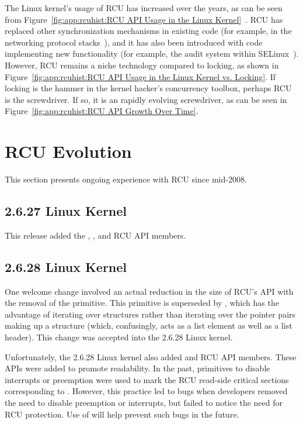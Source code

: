 The Linux kernel's usage of RCU has increased over the years,
as can be seen from
Figure~\ref{fig:app:rcuhist:RCU API Usage in the Linux Kernel}~\cite{PaulEMcKenneyRCUusagePage}.
RCU has replaced other synchronization mechanisms
in existing code
(for example,  in the networking protocol
stacks~\cite{Molnar00a,Torvalds2.5.69,Torvalds2.5.70}),
and it has also been introduced with code implementing
new functionality
(for example, the audit system within SELinux~\cite{JamesMorris04b}).
However, RCU remains a niche technology compared to locking,
as shown in
Figure~\ref{fig:app:rcuhist:RCU API Usage in the Linux Kernel vs. Locking}.
If locking is the hammer in the kernel hacker's concurrency toolbox,
perhaps RCU is the screwdriver.
If so, it is an rapidly evolving screwdriver, as can be seen in
Figure~\ref{fig:app:rcuhist:RCU API Growth Over Time}.

\section{RCU Evolution}
\label{sec:app:rcuhist:RCU Evolution}

This section presents ongoing experience with RCU since mid-2008.

\subsection{2.6.27 Linux Kernel}

This release added the
,
, and
 RCU API members.

\subsection{2.6.28 Linux Kernel}

One welcome change involved an actual reduction in the size of RCU's
API with the removal of the  primitive.
This primitive is superseded by ,
which has the advantage of iterating over structures rather than
iterating over the pointer pairs making up a 
structure (which, confusingly, acts as a list element as well
as a list header).
This change was accepted into the 2.6.28 Linux kernel.

Unfortunately, the 2.6.28 Linux kernel also added
 and
 RCU API members.
These APIs were added to promote readability.
In the past, primitives to disable interrupts or preemption were used
to mark the RCU read-side critical sections corresponding to
.
However, this practice led to bugs when developers removed the need
to disable preemption or interrupts, but failed to notice the need
for RCU protection.
Use of  will help prevent such bugs in the
future.

